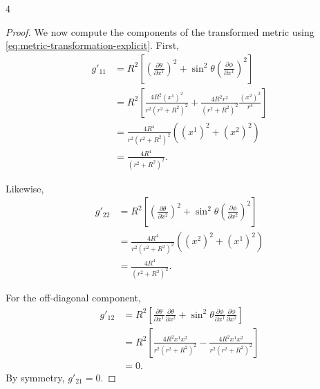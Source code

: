 \documentclass[11pt]{article}
\begin{document}
\begin{problem}{4}
\begin{enumerate}[label=(\alph*)]
\begin{proof}
    We now compute the components of the transformed metric
    using \cref{eq:metric-transformation-explicit}.
    First,
    \begin{equation}
        \label{eq:metric-g11}
        \begin{aligned}
            g'_{11}
            &= R^2\left[
                \left(\frac{\partial\theta}{\partial x^1}\right)^2
                + \sin^2\theta
                \left(\frac{\partial\phi}{\partial x^1}\right)^2
            \right] \\
            &= R^2\left[
                \frac{4R^2(x^1)^2}{r^2(r^2+R^2)^2}
                + \frac{4R^2r^2}{(r^2+R^2)^2}
                  \frac{(x^2)^2}{r^4}
            \right] \\
            &= \frac{4R^4}{r^2(r^2+R^2)^2}
                \left((x^1)^2+(x^2)^2\right) \\
            &= \frac{4R^4}{(r^2+R^2)^2}.
        \end{aligned}
    \end{equation}

    Likewise,
    \begin{equation}
        \label{eq:metric-g22}
        \begin{aligned}
            g'_{22}
            &= R^2\left[
                \left(\frac{\partial\theta}{\partial x^2}\right)^2
                + \sin^2\theta
                \left(\frac{\partial\phi}{\partial x^2}\right)^2
            \right] \\
            &= \frac{4R^4}{r^2(r^2+R^2)^2}
                \left((x^2)^2+(x^1)^2\right) \\
            &= \frac{4R^4}{(r^2+R^2)^2}.
        \end{aligned}
    \end{equation}

    For the off-diagonal component,
    \begin{equation}
        \label{eq:metric-g12}
        \begin{aligned}
            g'_{12}
            &= R^2\left[
                \frac{\partial\theta}{\partial x^1}
                \frac{\partial\theta}{\partial x^2}
                + \sin^2\theta
                \frac{\partial\phi}{\partial x^1}
                \frac{\partial\phi}{\partial x^2}
            \right] \\
            &= R^2\left[
                \frac{4R^2x^1x^2}{r^2(r^2+R^2)^2}
                - \frac{4R^2x^1x^2}{r^2(r^2+R^2)^2}
            \right] \\
            &= 0.
        \end{aligned}
    \end{equation}
    By symmetry, \(g'_{21}=0\).


\end{proof}
\end{enumerate}
\end{problem}
\end{document}
